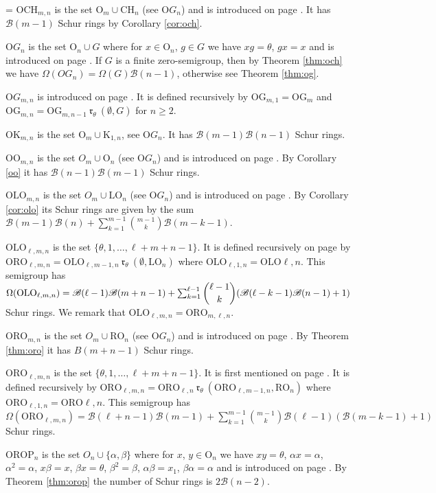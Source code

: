 \documentclass{article}
\makeatletter
\newcommand{\hangpara}[2]{\hangindent#1\hangafter#2\noindent}
\newenvironment{hangparas}[2]{\setlength{\parindent}{\z@}
  \everypar={\hangpara{#1}{#2}}}{\par}
\theoremstyle{plain}
\theoremstyle{definition}
\newcommand{\thmref}[1]{Theorem \ref{#1}}
\newcommand{\corref}[1]{Corollary \ref{#1}}
\newcommand{\B}{\mathscr{B}}
\renewcommand{\O}{\mathrm{O}}
\newcommand{\K}{\mathrm{K}}
\newcommand{\LO}{\mathrm{LO}}
\newcommand{\RO}{\mathrm{RO}}
\newcommand{\ORO}{\mathrm{ORO}}
\newcommand{\OLO}{\mathrm{OLO}}
\newcommand{\OROP}{\mathrm{OROP}}
\newcommand{\CH}{\mathrm{CH}}
\newcommand{\OO}{\mathrm{OO}}
\newcommand{\OCH}{\mathrm{OCH}}
\newcommand{\OG}{\mathrm{OG}}
\renewcommand{\r}[1]{\ \mathfrak{r}_{#1}\ }
\makeatother
\begin{document}
\begin{hangparas}{15pt}{1}
$\OCH_{m,n}$ is the set $\O_m\cup\CH_n$ (see $\O G_n$) and is introduced on page \pageref{och}. It has $\B(m-1)$ Schur rings by \corref{cor:och}.

$\O G_n$ is the set $\O_n\cup G$ where for $x\in \O_n$, $g\in G$ we have $xg=\theta$, $gx=x$ and is introduced on page \pageref{og}. If $G$ is a finite zero-semigroup, then by \thmref{thm:och} we have $\Omega(OG_n)=\Omega(G)\B(n-1)$, otherwise see \thmref{thm:og}.

$\O G_{m, n}$ is introduced on page \pageref{ogtwo}. It is defined recursively by $\OG_{m,1} = \OG_m$ and $\OG_{m,n} = \OG_{m,n-1}\r\theta (\emptyset, G)$ for $n\ge 2$.

$\O \K_{m, n}$ is the set $\O_m \cup \K_{1,n}$, see $\O G_n$. It has $\B(m-1)\B(n-1)$ Schur rings.

$\OO_{m,n}$ is the set $O_m\cup\O_n$ (see $\O G_n$) and is introduced on page \pageref{oo}. By \corref{oo} it has $\B(n-1)\B(m-1)$ Schur rings.

$\OLO_{m,n}$ is the set $O_m\cup\LO_n$ (see $\O G_n$) and is introduced on page \pageref{olo}. By \corref{cor:olo} its Schur rings are given by the sum $\B(m-1)\B(n) + \sum_{k=1}^{m-1} \binom{m-1}{k}\B(m-k-1)$.

$\OLO_{\ell, m, n}$ is the set $\{\theta, 1, \ldots, \ell+m+n-1\}$. It is defined recursively on page \pageref{olothree} by $\ORO_{\ell, m, n} = \OLO_{\ell, m-1, n} \r{\theta} (\emptyset, \LO_n)$  where $\OLO_{\ell, 1, n}=\OLO{\ell, n}$. This semigroup has $\Omega(\OLO_{\ell,m,n}) = \B(\ell-1)\B(m+n-1) + \sum_{k=1}^{\ell-1} \dbinom{\ell-1}{k}(\B(\ell-k-1)\B(n-1)+1)$ Schur rings. We remark that $\OLO_{\ell, m, n} = \ORO_{m, \ell, n}$. 


$\ORO_{m,n}$ is the set $O_m\cup\RO_n$ (see $\O G_n$) and is introduced on page \pageref{oro}. By \thmref{thm:oro} it has $B(m+n-1)$ Schur rings.

$\ORO_{\ell, m,n}$ is the set $\{\theta, 1, \ldots, \ell+m+n-1\}$. It is first mentioned on page \pageref{orothree}. It is defined recursively by $\ORO_{\ell, m, n} = \ORO_{\ell, n} \r{\theta} (\ORO_{\ell, m-1,n}, \RO_n)$ where $\ORO_{\ell, 1, n}=\ORO{\ell, n}$. This semigroup has $\Omega(\ORO_{\ell,m,n}) = \B(\ell+n-1)\B(m-1) + \sum_{k=1}^{m-1} \binom{m-1}{k}\B(\ell-1)(\B(m-k-1)+1)$ Schur rings.

$\OROP_n$ is the set $O_n\cup \{\alpha,\beta\}$ where for $x$, $y\in \O_n$ we have $xy=\theta$, $\alpha x=\alpha$, $\alpha^2=\alpha$, $x\beta=x$, $\beta x =\theta$, $\beta^2=\beta$, $\alpha\beta=x_1$, $\beta\alpha=\alpha$ and is introduced on page \pageref{orop}. By \thmref{thm:orop} the number of Schur rings is $2\B(n-2)$.


\end{hangparas}
\end{document}
